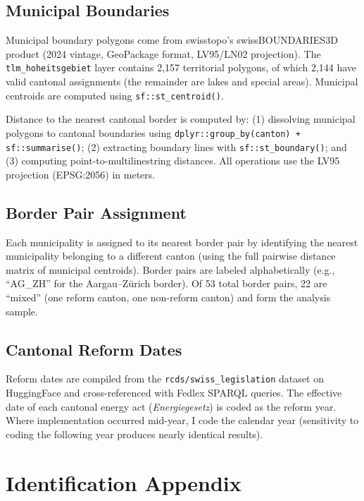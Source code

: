 \documentclass[12pt]{article}
\begin{document}
\subsection{Municipal Boundaries}

Municipal boundary polygons come from swisstopo's swissBOUNDARIES3D product (2024 vintage, GeoPackage format, LV95/LN02 projection). The \texttt{tlm\_hoheitsgebiet} layer contains 2,157 territorial polygons, of which 2,144 have valid cantonal assignments (the remainder are lakes and special areas). Municipal centroids are computed using \texttt{sf::st\_centroid()}.

Distance to the nearest cantonal border is computed by: (1) dissolving municipal polygons to cantonal boundaries using \texttt{dplyr::group\_by(canton) + sf::summarise()}; (2) extracting boundary lines with \texttt{sf::st\_boundary()}; and (3) computing point-to-multilinestring distances. All operations use the LV95 projection (EPSG:2056) in meters.

\subsection{Border Pair Assignment}

Each municipality is assigned to its nearest border pair by identifying the nearest municipality belonging to a different canton (using the full pairwise distance matrix of municipal centroids). Border pairs are labeled alphabetically (e.g., ``AG\_ZH'' for the Aargau--Zürich border). Of 53 total border pairs, 22 are ``mixed'' (one reform canton, one non-reform canton) and form the analysis sample.

\subsection{Cantonal Reform Dates}

Reform dates are compiled from the \texttt{rcds/swiss\_legislation} dataset on HuggingFace and cross-referenced with Fedlex SPARQL queries. The effective date of each cantonal energy act (\textit{Energiegesetz}) is coded as the reform year. Where implementation occurred mid-year, I code the calendar year (sensitivity to coding the following year produces nearly identical results).

\section{Identification Appendix}
\label{app:id}
\end{document}
